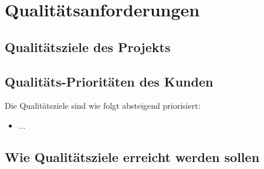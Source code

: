 \section{Qualitätsanforderungen}

	\subsection{Qualitätsziele des Projekts}
		
	\subsection{Qualitäts-Prioritäten des Kunden}
		Die Qualitätsziele sind wie folgt absteigend priorisiert:
		\begin{itemize}
			\item ...
		\end{itemize}

	\subsection{Wie Qualitätsziele erreicht werden sollen}